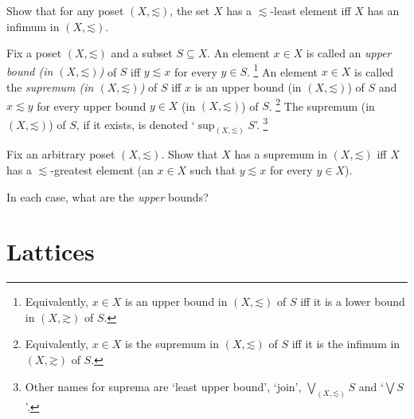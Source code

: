 \begin{namedthm}
	\label{exercise:lb_exist_latt}
	Show that for any poset $(X,\mathord{\lesssim})$, the set $X$ has a $\lesssim$-least element iff $X$ has an infimum in $(X,\mathord{\lesssim})$.
\end{namedthm}

\begin{definition}
	\label{definition:ub_lub}
	Fix a poset $(X,\mathord{\lesssim})$ and a subset $S \subseteq X$. An element $x \in X$ is called an \emph{upper bound (in $(X,\mathord{\lesssim})$)} of $S$ iff $y \lesssim x$ for every $y \in S$.%
		\footnote{Equivalently, $x \in X$ is an upper bound in $(X,\mathord{\lesssim})$ of $S$ iff it is a lower bound in $(X,\mathord{\gtrsim})$ of $S$.}
	An element $x \in X$ is called the \emph{supremum (in $(X,\mathord{\lesssim})$)} of $S$ iff $x$ is an upper bound (in $(X,\mathord{\lesssim})$) of $S$ and $x \lesssim y$ for every upper bound $y \in X$ (in $(X,\mathord{\lesssim})$) of $S$.%
		\footnote{Equivalently, $x \in X$ is the supremum in $(X,\mathord{\lesssim})$ of $S$ iff it is the infimum in $(X,\mathord{\gtrsim})$ of $S$.}
	The supremum (in $(X,\mathord{\lesssim})$) of $S$, if it exists, is denoted `$\sup_{(X,\mathord{\lesssim})} S$'.%
		\footnote{Other names for suprema are `least upper bound', `join', $\bigvee_{(X,\mathord{\lesssim})} S$ and `$\bigvee S$'.}
\end{definition}

\begin{namedthm}
	\label{exercise:ub_exist_latt}
	Fix an arbitrary poset $(X,\mathord{\lesssim})$. Show that $X$ has a supremum in $(X,\mathord{\lesssim})$ iff $X$ has a $\lesssim$-greatest element (an $x \in X$ such that $y \lesssim x$ for every $y \in X$).
\end{namedthm}

\begin{namedthm}
	\label{exercise:lb-R-upp}
	In each case, what are the \emph{upper} bounds?
\end{namedthm}



\section{Lattices}
\label{tar:latt}


